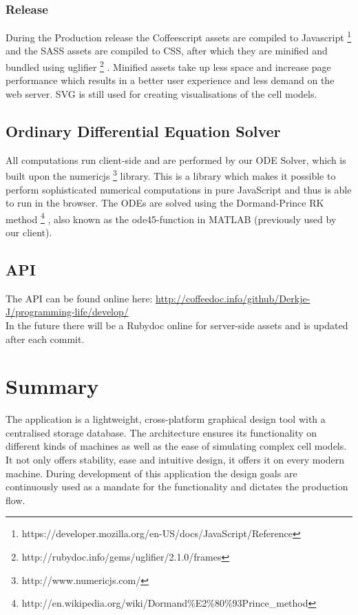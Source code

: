 \documentclass{report}
\begin{document}
			\subsubsection{Release}
				During the Production release the Coffeescript assets are compiled to Javascript \footnote{https://developer.mozilla.org/en-US/docs/JavaScript/Reference} and the SASS assets are compiled to CSS, after which they are minified and bundled using uglifier \footnote{http://rubydoc.info/gems/uglifier/2.1.0/frames} . Minified assets take up less space and increase page performance which results in a better user experience and less demand on the web server. 
				SVG is still used for creating visualisations of the cell models.
		\newpage		
		\subsection{Ordinary Differential Equation Solver}
			All computations run client-side and are performed by our ODE Solver, which is built upon the numericjs \footnote{http://www.numericjs.com/} library. This is a library which makes it possible to perform sophisticated numerical computations in pure JavaScript and thus is able to run in the browser. The ODEs are solved using the Dormand-Prince RK method \footnote{http://en.wikipedia.org/wiki/Dormand\%E2\%80\%93Prince\_method} , also known as the ode45-function in MATLAB (previously used by our client).
			
		\subsection{API}
			The API can be found online here: \url{http://coffeedoc.info/github/Derkje-J/programming-life/develop/} \\
			In the future there will be a Rubydoc online for server-side assets and is updated after each commit.
		\newpage
			
	\section{Summary}
		The application is a lightweight, cross-platform graphical design tool with a centralised storage database. The architecture ensures its functionality on different kinds of machines as well as the ease of simulating complex cell models. It not only offers stability, ease and intuitive design, it offers it on every modern machine. During development of this application the design goals are continuously used as a mandate for the functionality and dictates the production flow.
\end{document}
